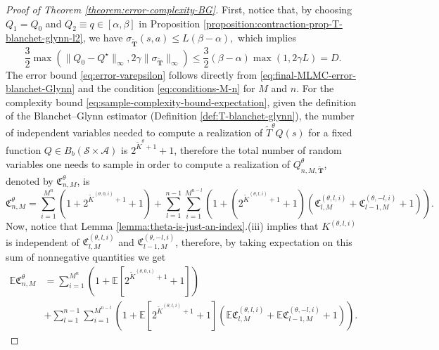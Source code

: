 \documentclass[11pt]{article}
\numberwithin{equation}{section}
\theoremstyle{definition}
\theoremstyle{remark}
\begin{document}
\begin{proof}[Proof of Theorem \ref{theorem:error-complexity-BG}]
First, notice that, by choosing $Q_1 = Q_{0}$ and $Q_2 \equiv q \in [\alpha,\beta]$ in Proposition \ref{proposition:contraction-prop-T-blanchet-glynn-l2}, we have 
$ 
\sigma_{\mathbf{\tilde{T}}}(s,a) \leq L (\beta - \alpha),
$ 
which implies 
\[
\frac{3}{2}\max\left( \| Q_0 - Q^\star\|_{\infty},  2 \gamma \| \sigma_{\tilde{\mathbf T}} \|_{\infty} \right) \leq  \frac{3}{2}(\beta - \alpha) \max(1,2 \gamma L) = D. 
\]
    The error bound \eqref{eq:error-varepsilon} follows directly from \eqref{eq:final-MLMC-error-blanchet-Glynn} and the condition \eqref{eq:conditions-M-n} for $M$ and $ n$.
    For the complexity bound \eqref{eq:sample-complexity-bound-expectation}, given the definition of the Blanchet--Glynn estimator (Definition \ref{def:T-blanchet-glynn}), the number of independent variables needed to compute a realization of $\tilde{T}^\theta Q(s)$ for a fixed function $Q \in B_b(\mathcal S \times \mathcal A)$ is \(2^{\tilde{K}^\theta + 1} + 1\), therefore the total number of random variables one needs to sample in order to compute a realization of $Q^\theta_{n,M,\tilde{\mathbf T}}$,   denoted by $\mathfrak C_{n,M}^\theta$, is
    \begin{equation*}
        \label{eq:sample-complexity-def}
        \mathfrak C_{n,M}^\theta = \sum_{i = 1}^{M^n}\left(1 + 2^{\tilde K^{(\theta,0,i)} + 1} + 1\right) + \sum_{l = 1}^{n-1} \sum_{i = 1}^{M^{n-l}} \left( 1
        + \left(2^{\tilde K^{(\theta,l,i)} + 1} + 1 \right)\left(\mathfrak C^{(\theta,l,i)} _{l,M} + \mathfrak C ^{(\theta,-l,i)}_{l-1,M} + 1\right)\right).
    \end{equation*}
    Now, notice that Lemma \ref{lemma:theta-is-just-an-index}.(iii) implies that $K^{(\theta,l,i)}$ is independent of $\mathfrak C^{(\theta,l,i)} _{l,M}$ and $\mathfrak C ^{(\theta,-l,i)}_{l-1,M}$, therefore, by taking expectation on this sum of nonnegative quantities we get
    \[
        \begin{aligned}
            \mathbb E \mathfrak C_{n,M}^\theta & = \sum_{i = 1}^{M^n}\left(1 + \mathbb E \left[2^{\tilde K^{(\theta,0,i)} + 1} + 1\right] \right) \\
                                              & + \sum_{l = 1}^{n-1} \sum_{i = 1}^{M^{n-l}}\left( 1
            + \mathbb E\left[ 2^{\tilde K^{(\theta,l,i)} + 1} + 1\right]\left(\mathbb E \mathfrak C^{(\theta,l,i)} _{l,M} + \mathbb E\mathfrak C ^{(\theta,-l,i)}_{l-1,M} + 1\right)\right).
        \end{aligned}
\]
\end{proof}
\end{document}
